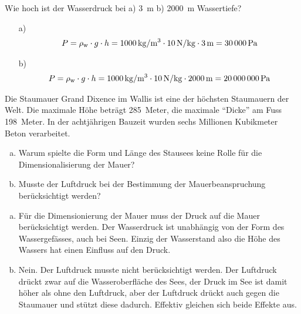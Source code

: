 \documentclass[12pt,a4paper,twoside]{article}
\begin{document}
\begin{aufgabe}
	Wie hoch ist der Wasserdruck bei a) \SI{3}{m} b) \SI{2000}{m} Wassertiefe?
	\begin{loesung}
	\begin{itemize}
		\item[a)]
			\begin{eqnarray*}
				P=\rho_{\textrm w}\cdot g\cdot h=\SI{1000}{kg/m^3}\cdot\SI{10}{N/kg}\cdot\SI{3}{m}=\SI{30000}{Pa}
			\end{eqnarray*}
		\item[b)]
			\begin{eqnarray*}
				P=\rho_{\textrm w}\cdot g\cdot h=\SI{1000}{kg/m^3}\cdot\SI{10}{N/kg}\cdot\SI{2000}{m}=\SI{20000000}{Pa}
			\end{eqnarray*}
	\end{itemize}
\end{loesung}

\end{aufgabe}

\begin{aufgabe}
	Die Staumauer Grand Dixence im Wallis ist eine der höchsten Staumauern der Welt.
	Die maximale Höhe beträgt \SI{285}{Meter}, die maximale ``Dicke'' am Fuss \SI{198}{Meter}.
	In der achtjährigen Bauzeit wurden sechs Millionen Kubikmeter Beton verarbeitet.
	\begin{enumerate} [a)]
		\item Warum spielte die Form und Länge des Stausees keine Rolle für die Dimensionalisierung der Mauer?
		\item Musste der Luftdruck bei der Bestimmung der Mauerbeanspruchung berücksichtigt werden?
	\end{enumerate}

	\begin{loesung}
		\begin{enumerate} [a)]
			\item Für die Dimensionierung der Mauer muss der Druck auf die Mauer berücksichtigt werden.
				Der Wasserdruck ist unabhängig von der Form des Wassergefässes, auch bei Seen.
				Einzig der Wasserstand also die Höhe des Wassers hat einen Einfluss auf den Druck.
			\item Nein. Der Luftdruck musste nicht berücksichtigt werden. Der Luftdruck drückt zwar auf die
				Wasseroberfläche des Sees, der Druck im See ist damit höher als ohne den Luftdruck, aber
				der Luftdruck drückt auch gegen die Staumauer und stützt diese dadurch.
				Effektiv gleichen sich beide Effekte aus.
		\end{enumerate}
	\end{loesung}


\end{aufgabe}
\end{document}
